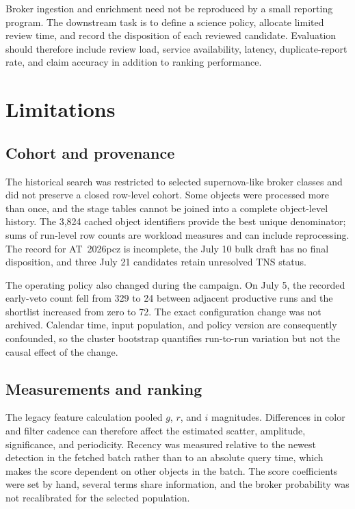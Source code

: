 \documentclass[11pt]{article}
\begin{document}
Broker ingestion and enrichment need not be reproduced by a small reporting program. The downstream task is to define a science policy, allocate limited review time, and record the disposition of each reviewed candidate. Evaluation should therefore include review load, service availability, latency, duplicate-report rate, and claim accuracy in addition to ranking performance.

\section{Limitations}
\label{sec:limitations}

\subsection{Cohort and provenance}

The historical search was restricted to selected supernova-like broker classes and did not preserve a closed row-level cohort. Some objects were processed more than once, and the stage tables cannot be joined into a complete object-level history. The 3,824 cached object identifiers provide the best unique denominator; sums of run-level row counts are workload measures and can include reprocessing. The record for AT~2026pcz is incomplete, the July 10 bulk draft has no final disposition, and three July 21 candidates retain unresolved TNS status.

The operating policy also changed during the campaign. On July 5, the recorded early-veto count fell from 329 to 24 between adjacent productive runs and the shortlist increased from zero to 72. The exact configuration change was not archived. Calendar time, input population, and policy version are consequently confounded, so the cluster bootstrap quantifies run-to-run variation but not the causal effect of the change.

\subsection{Measurements and ranking}

The legacy feature calculation pooled $g$, $r$, and $i$ magnitudes. Differences in color and filter cadence can therefore affect the estimated scatter, amplitude, significance, and periodicity. Recency was measured relative to the newest detection in the fetched batch rather than to an absolute query time, which makes the score dependent on other objects in the batch. The score coefficients were set by hand, several terms share information, and the broker probability was not recalibrated for the selected population.
\end{document}
